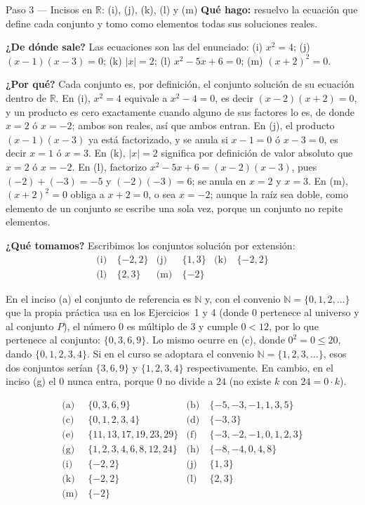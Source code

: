 \documentclass[11pt]{article}
\begin{document}
\begin{paso}{Paso 3 --- Incisos en $\mathbb{R}$: (i), (j), (k), (l) y (m)}
\textbf{Qué hago:} resuelvo la ecuación que define cada conjunto y tomo como elementos todas
sus soluciones reales.

\textbf{¿De dónde sale?} Las ecuaciones son las del enunciado: (i) $x^{2}=4$;
(j) $(x-1)(x-3)=0$; (k) $|x|=2$; (l) $x^{2}-5x+6=0$; (m) $(x+2)^{2}=0$.

\textbf{¿Por qué?} Cada conjunto es, por definición, el conjunto solución de su ecuación
dentro de $\mathbb{R}$. En (i), $x^{2}=4$ equivale a $x^{2}-4=0$, es decir $(x-2)(x+2)=0$, y
un producto es cero exactamente cuando alguno de sus factores lo es, de donde $x=2$ ó $x=-2$;
ambos son reales, así que ambos entran. En (j), el producto $(x-1)(x-3)$ ya está factorizado,
y se anula si $x-1=0$ ó $x-3=0$, es decir $x=1$ ó $x=3$. En (k), $|x|=2$ significa por
definición de valor absoluto que $x=2$ ó $x=-2$. En (l), factorizo
$x^{2}-5x+6=(x-2)(x-3)$, pues $(-2)+(-3)=-5$ y $(-2)(-3)=6$; se anula en $x=2$ y $x=3$.
En (m), $(x+2)^{2}=0$ obliga a $x+2=0$, o sea $x=-2$; aunque la raíz sea doble, como elemento
de un conjunto se escribe una sola vez, porque un conjunto no repite elementos.

\textbf{¿Qué tomamos?} Escribimos los conjuntos solución por extensión:
\begin{align*}
	\text{(i)}\ & \{-2,2\} & \text{(j)}\ & \{1,3\} & \text{(k)}\ & \{-2,2\}\\
	\text{(l)}\ & \{2,3\} & \text{(m)}\ & \{-2\} &&
\end{align*}
\end{paso}

\begin{nota}
En el inciso (a) el conjunto de referencia es $\mathbb{N}$ y, con el convenio
$\mathbb{N}=\{0,1,2,\dots\}$ que la propia práctica usa en los Ejercicios~1 y 4 (donde $0$
pertenece al universo y al conjunto $P$), el número $0$ es múltiplo de $3$ y cumple $0<12$,
por lo que pertenece al conjunto: $\{0,3,6,9\}$. Lo mismo ocurre en (c), donde $0^{2}=0\le
20$, dando $\{0,1,2,3,4\}$. Si en el curso se adoptara el convenio $\mathbb{N}=\{1,2,3,\dots\}$,
esos dos conjuntos serían $\{3,6,9\}$ y $\{1,2,3,4\}$ respectivamente. En cambio, en el inciso
(g) el $0$ nunca entra, porque $0$ no divide a $24$ (no existe $k$ con $24=0\cdot k$).
\end{nota}

\begin{resp}
\begin{align*}
	\text{(a)}\ & \{0,3,6,9\} & \text{(b)}\ & \{-5,-3,-1,1,3,5\}\\
	\text{(c)}\ & \{0,1,2,3,4\} & \text{(d)}\ & \{-3,3\}\\
	\text{(e)}\ & \{11,13,17,19,23,29\} & \text{(f)}\ & \{-3,-2,-1,0,1,2,3\}\\
	\text{(g)}\ & \{1,2,3,4,6,8,12,24\} & \text{(h)}\ & \{-8,-4,0,4,8\}\\
	\text{(i)}\ & \{-2,2\} & \text{(j)}\ & \{1,3\}\\
	\text{(k)}\ & \{-2,2\} & \text{(l)}\ & \{2,3\}\\
	\text{(m)}\ & \{-2\} &&
\end{align*}
\end{resp}
\end{document}
